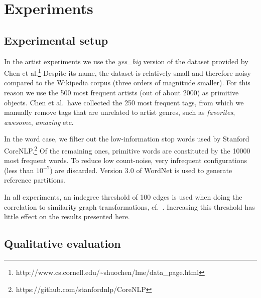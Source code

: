 \documentclass[conference]{IEEEtran}
\begin{document}
\section{Experiments}
\label{sec:experiments}

\subsection{Experimental setup}
\label{sec:setup}

In the artist experiments we use the \emph{yes\_big} version of the dataset provided by 
Chen et al.\footnote{http://www.cs.cornell.edu/\~{}shuochen/lme/data\_page.html} 
Despite its name, the dataset is relatively small and therefore noisy compared to the Wikipedia corpus 
(three orders of magnitude smaller). For this reason we use the 500 most frequent
artists (out of about 2000) as primitive objects. Chen et al.\ have collected the 250 most frequent tags, from which we 
manually remove tags that are unrelated to artist genres, such as \emph{favorites}, \emph{awesome}, \emph{amazing} etc.

In the word case, we filter out the low-information stop words used by Stanford CoreNLP.\footnote{https://github.com/stanfordnlp/CoreNLP}
Of the remaining ones, primitive words are constituted by the 10000 most frequent words. To reduce low count-noise, 
very infrequent configurations (less than $10^{-7}$) are discarded. Version 3.0 of WordNet is used to generate
reference partitions.

In all experiments, an indegree threshold of 100 edges is used when doing the correlation to similarity graph 
transformations, cf.\ \cite{Gornerup15}. Increasing this threshold has little effect on the results presented here.

\subsection{Qualitative evaluation}
\label{sec:qualitative}
\end{document}
